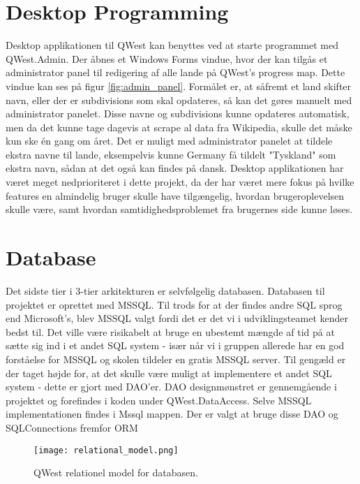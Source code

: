 \section{Desktop Programming}\label{sec:deskProgramming}
Desktop applikationen til QWest kan benyttes ved at starte programmet med QWest.Admin. Der åbnes et Windows Forms \cite{WinForms} vindue, hvor der kan tilgås et administrator panel til redigering af alle lande på QWest's progress map. Dette vindue kan ses på figur \ref{fig:admin_panel}. Formålet er, at såfremt et land skifter navn, eller der er subdivisions som skal opdateres, så kan det gøres manuelt med administrator panelet. Disse navne og subdivisions kunne opdateres automatisk, men da det kunne tage dagevis at scrape al data fra Wikipedia, skulle det måske kun ske én gang om året. Det er muligt med administrator panelet at tildele ekstra navne til lande, eksempelvis kunne Germany få tildelt "Tyskland" som ekstra navn, sådan at det også kan findes på dansk. 
Desktop applikationen har været meget nedprioriteret i dette projekt, da der har været mere fokus på hvilke features en almindelig bruger skulle have tilgængelig, hvordan brugeroplevelsen skulle være, samt hvordan samtidighedsproblemet fra brugernes side kunne løses.

\section{Database}\label{sec:database}
Det sidste tier i 3-tier arkitekturen er selvfølgelig databasen. Databasen til projektet er oprettet med MSSQL\cite{MSSQL}. Til trods for at der findes andre SQL sprog end Microsoft's, blev MSSQL valgt fordi det er det vi i udviklingsteamet kender bedst til. Det ville være risikabelt at bruge en ubestemt mængde af tid på at sætte sig ind i et andet SQL system - især når vi i gruppen allerede har en god forståelse for MSSQL og skolen tildeler en gratis MSSQL server. Til gengæld er der taget højde for, at det skulle være muligt at implementere et andet SQL system - dette er gjort med DAO'er. DAO\cite{dao} designmønstret er gennemgående i projektet og forefindes i koden under QWest.DataAccess. Selve MSSQL implementationen findes i Mssql mappen. Der er valgt at bruge disse DAO og SQLConnections fremfor ORM %

\begin{figure}
    \texttt{[image: relational\_model.png]}
    \caption{QWest relationel model for databasen.}
    \label{fig:relational_model}
\end{figure}

